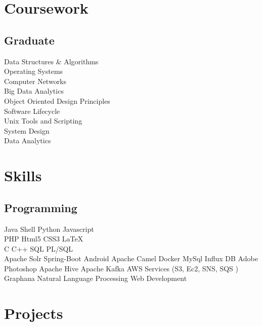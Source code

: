 \documentclass[]{deedy-resume-openfont}
\begin{document}
\begin{minipage}[t]{0.33\textwidth}

\section{Coursework}
\subsection{Graduate}
Data Structures \& Algorithms\\
Operating Systems \\
Computer Networks \\
Big Data Analytics \\
Object Oriented Design Principles \\
Software Lifecycle\\
Unix Tools and Scripting \\
System Design \\
Data Analytics \\
\sectionsep



\section{Skills}
\subsection{Programming}
Java \textbullet{}   Shell \textbullet{} Python \textbullet{} Javascript \\
PHP \textbullet{} Html5 \textbullet{} CSS3 \textbullet{} \LaTeX\ \\ 
C \textbullet{} C++ \textbullet{} SQL \textbullet{} PL/SQL \\
Apache Solr \textbullet{} Spring-Boot \textbullet{} Android \textbullet{} Apache Camel \textbullet{} Docker \textbullet{} MySql \textbullet{} Influx DB \textbullet{} Adobe Photoshop \textbullet{} Apache Hive \textbullet{} Apache Kafka \textbullet{} AWS Services (S3, Ec2, SNS, SQS ) \textbullet{} Graphana \textbullet{} Natural Language Processing
\textbullet{} Web Development 
\sectionsep 

\section{Projects}

\end{minipage}
\end{document}
